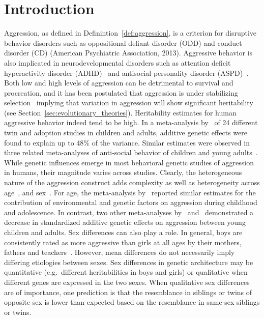\section{Introduction}
Aggression, as defined in Definintion~\ref{def:aggression}, is a criterion for disruptive behavior disorders such as oppositional defiant disorder (ODD) and conduct disorder (CD) (American Psychiatric Association, 2013).
Aggressive behavior is also implicated in neurodevelopmental disorders such as attention deficit hyperactivity disorder (ADHD)~\cite{Hamshere2013, Monuteaux2009} and antisocial personality disorder  (ASPD)~\cite{Nouvion2007, Schaeffer2003}.
Both low and high levels of aggression can be detrimental to survival and procreation, and it has been postulated that aggression is under stabilizing selection~\cite{Anholt2012} implying that variation in aggression will show significant heritability (see Section~\ref{sec:evolutionary_theories}).
Heritability estimates for human aggressive behavior indeed tend to be high.
In a meta-analysis by~\citet{Miles1997} of 24 different twin and adoption studies in children and adults, additive genetic effects were found to explain up to 48\% of the variance.
Similar estimates were observed in three related meta-analyses of anti-social behavior of children and young adults~\cite{Ferguson2010, Mason1994, Rhee2002}. 
While genetic influences emerge in most behavioral genetic studies of aggression in humans, their magnitude varies across studies.
Clearly, the heterogeneous nature of the aggression construct adds complexity as well as heterogeneity across age~\cite{Rhee2002}, and sex~\cite{Vierikko2003}.
For age, the meta-analysis by~\citet{Miles1997} reported similar estimates for the contribution of environmental and genetic factors on aggression during childhood and adolescence.
In contrast, two other meta-analyses by~\citet{Ferguson2010} and~\citet{Rhee2002} demonstrated a decrease in standardized additive genetic effects on aggression between young children and adults. 
Sex differences can also play a role.
In general, boys are consistently rated as more aggressive than girls at all ages by their mothers, fathers and teachers~\cite{Hudziak2003}.
However, mean differences do not necessarily imply differing etiologies between sexes.
Sex differences in genetic architecture may be quantitative (e.g.\ different heritabilities in boys and girls) or qualitative when different genes are expressed in the two sexes.
When qualitative sex differences are of importance, one prediction is that the resemblance in siblings or twins of opposite sex is lower than expected based on the resemblance in same-sex siblings or twins.

